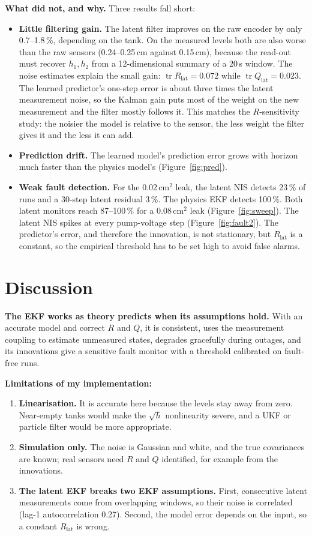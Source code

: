 \documentclass[11pt]{article}
\begin{document}
\textbf{What did not, and why.} Three results fall short:
\nopagebreak[4]
\begin{itemize}\itemsep0pt
\item \textbf{Little filtering gain.} The latent filter improves on the raw encoder by only 0.7--1.8\,\%, depending on the tank. On the measured levels both are also worse than the raw sensors (0.24--0.25\,cm against 0.15\,cm), because the read-out must recover $h_1,h_2$ from a 12-dimensional summary of a 20\,s window. The noise estimates explain the small gain: $\operatorname{tr}R_{\text{lat}}=0.072$ while $\operatorname{tr}Q_{\text{lat}}=0.023$. The learned predictor's one-step error is about three times the latent measurement noise, so the Kalman gain puts most of the weight on the new measurement and the filter mostly follows it. This matches the $R$-sensitivity study: the noisier the model is relative to the sensor, the less weight the filter gives it and the less it can add.
\item \textbf{Prediction drift.} The learned model's prediction error grows with horizon much faster than the physics model's (Figure~\ref{fig:pred}).
\item \textbf{Weak fault detection.} For the 0.02\,cm$^2$ leak, the latent NIS detects 23\,\% of runs and a 30-step latent residual 3\,\%. The physics EKF detects 100\,\%. Both latent monitors reach 87--100\,\% for a 0.08\,cm$^2$ leak (Figure~\ref{fig:sweep}). The latent NIS spikes at every pump-voltage step (Figure~\ref{fig:fault2}). The predictor's error, and therefore the innovation, is not stationary, but $R_{\text{lat}}$ is a constant, so the empirical threshold has to be set high to avoid false alarms.
\end{itemize}

\section{Discussion}
\textbf{The EKF works as theory predicts when its assumptions hold.} With an accurate model and correct $R$ and $Q$, it is consistent, uses the measurement coupling to estimate unmeasured states, degrades gracefully during outages, and its innovations give a sensitive fault monitor with a threshold calibrated on fault-free runs.

\textbf{Limitations of my implementation:}
\begin{enumerate}\itemsep0pt
\item \textbf{Linearisation.} It is accurate here because the levels stay away from zero. Near-empty tanks would make the $\sqrt h$ nonlinearity severe, and a UKF or particle filter would be more appropriate.
\item \textbf{Simulation only.} The noise is Gaussian and white, and the true covariances are known; real sensors need $R$ and $Q$ identified, for example from the innovations.
\item \textbf{The latent EKF breaks two EKF assumptions.} First, consecutive latent measurements come from overlapping windows, so their noise is correlated (lag-1 autocorrelation 0.27). Second, the model error depends on the input, so a constant $R_{\text{lat}}$ is wrong.
\end{enumerate}
\end{document}
